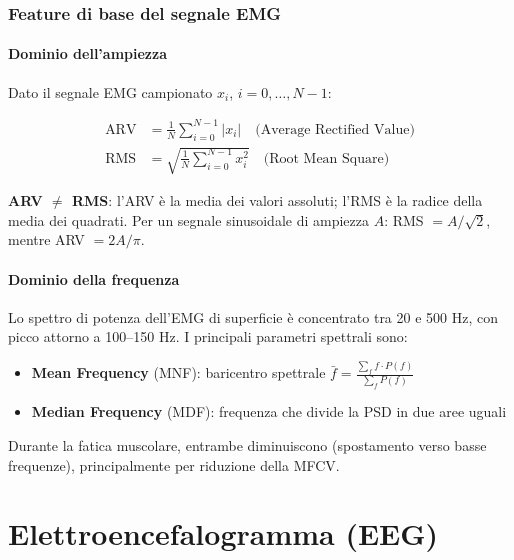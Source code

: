 \subsection{Feature di base del segnale EMG}

\subsubsection{Dominio dell'ampiezza}

Dato il segnale EMG campionato $x_i$, $i = 0, \ldots, N-1$:

\begin{align}
\text{ARV} &= \frac{1}{N}\sum_{i=0}^{N-1} |x_i| \quad \text{(Average Rectified Value)} \\[4pt]
\text{RMS} &= \sqrt{\frac{1}{N}\sum_{i=0}^{N-1} x_i^2} \quad \text{(Root Mean Square)}
\end{align}

\begin{attenzione}[]
\textbf{ARV $\neq$ RMS}: l'ARV è la media dei valori assoluti; l'RMS è la radice della media dei quadrati. Per un segnale sinusoidale di ampiezza $A$: RMS $= A/\sqrt{2}$, mentre ARV $= 2A/\pi$.
\end{attenzione}

\subsubsection{Dominio della frequenza}

Lo spettro di potenza dell'EMG di superficie è concentrato tra 20 e 500 Hz, con picco attorno a 100--150 Hz. I principali parametri spettrali sono:
\begin{itemize}
    \item \textbf{Mean Frequency} (MNF): baricentro spettrale $\bar{f} = \frac{\sum_f f \cdot P(f)}{\sum_f P(f)}$
    \item \textbf{Median Frequency} (MDF): frequenza che divide la PSD in due aree uguali
\end{itemize}
Durante la fatica muscolare, entrambe diminuiscono (spostamento verso basse frequenze), principalmente per riduzione della MFCV.

\chapter{Elettroencefalogramma (EEG)}

